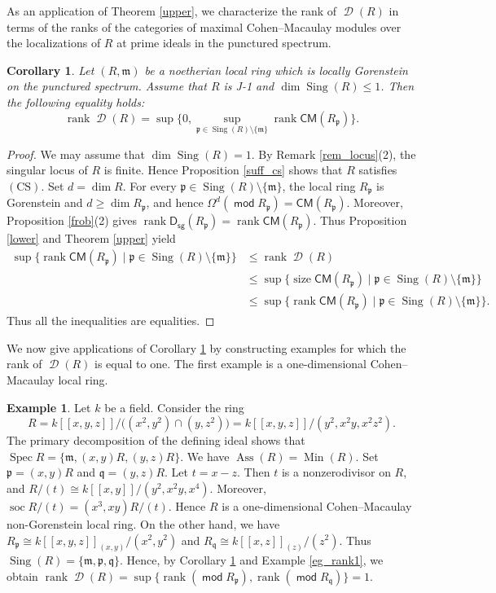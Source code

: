 \documentclass[10pt]{amsart}
\newtheorem{cor}[thm]{Corollary}
\theoremstyle{definition}
\newtheorem{ex}[thm]{Example}
\theoremstyle{remark}
\numberwithin{equation}{thm}
\def\Ass{\operatorname{Ass}}
\def\CM{\mathsf{CM}}
\def\d{\operatorname{\mathscr{D}}}
\def\dim{\operatorname{dim}}
\def\ds{\operatorname{\mathsf{D_{sg}}}}
\def\ge{\geqslant}
\def\le{\leqslant}
\def\m{\mathfrak{m}}
\def\Min{\operatorname{Min}}
\def\mod{\operatorname{\mathsf{mod}}}
\def\p{\mathfrak{p}}
\def\q{\mathfrak{q}}
\def\rank{\operatorname{rank}}
\def\Sing{\operatorname{Sing}}
\def\size{\operatorname{size}}
\def\soc{\operatorname{soc}}
\def\Spec{\operatorname{Spec}}
\def\sup{\operatorname{sup}}
\begin{document}
As an application of Theorem \ref{upper}, we characterize the rank of $\d(R)$ in terms of the ranks of the categories of maximal Cohen--Macaulay modules over the localizations of $R$ at prime ideals in the punctured spectrum.
\begin{cor}\label{equality}
Let $(R,\m)$ be a noetherian local ring which is locally Gorenstein on the punctured spectrum.
Assume that $R$ is J-1 and $\dim\Sing(R)\le1$.
Then the following equality holds:
\[
\rank\d(R)=\sup\{0,\sup_{\p\in\Sing(R)\setminus\{\m\}}\rank\CM(R_{\p})\}.
\]
\end{cor}
\begin{proof}
We may assume that $\dim\Sing(R)=1$.
By Remark \ref{rem_locus}(2), the singular locus of $R$ is finite. 
Hence Proposition \ref{suff_cs} shows that $R$ satisfies $(\mathrm{CS})$.
Set $d=\dim R$. 
For every $\p\in\Sing(R)\setminus\{\m\}$, the local ring $R_{\p}$ is Gorenstein and $d\ge\dim R_{\p}$, and hence $\Omega^{d}(\mod R_{\p})=\CM(R_{\p})$. 
Moreover, Proposition \ref{frob}(2) gives $\rank\ds(R_{\p})=\rank\CM(R_{\p})$.
Thus Proposition \ref{lower} and Theorem \ref{upper} yield
\begin{align*}
\sup\{\rank\CM(R_{\p})\mid\p\in\Sing(R)\setminus\{\m\}\}&\le\rank\d(R)\\
&\le\sup\{\size\CM(R_{\p})\mid\p\in\Sing(R)\setminus\{\m\}\}\\
&\le\sup\{\rank\CM(R_{\p})\mid\p\in\Sing(R)\setminus\{\m\}\}.
\end{align*}
Thus all the inequalities are equalities.
\end{proof}
We now give applications of Corollary \ref{equality} by constructing examples for which the rank of $\d(R)$ is equal to one.
The first example is a one-dimensional Cohen--Macaulay local ring.
\begin{ex}\label{eg_dim1}
Let $k$ be a field. 
Consider the ring
\[
R=k[\![x,y,z]\!]/\bigl((x^2,y^2)\cap(y,z^2)\bigr)
 =k[\![x,y,z]\!]/(y^2,x^{2}y,x^{2}z^{2}).
\]
The primary decomposition of the defining ideal shows that $\Spec R=\{\m,(x,y)R,(y,z)R\}$.
We have $\Ass(R)=\Min(R)$. 
Set $\p=(x,y)R$ and $\q=(y,z)R$.
Let $t=x-z$. 
Then $t$ is a nonzerodivisor on $R$, and $R/(t)\cong k[\![x,y]\!]/(y^2,x^{2}y,x^4)$.
Moreover, $\soc R/(t)=(x^3,xy)R/(t)$.
Hence $R$ is a one-dimensional Cohen--Macaulay non-Gorenstein local ring.
On the other hand, we have $R_{\p}\cong k[\![x,y,z]\!]_{(x,y)}/(x^2,y^2)$ and $R_{\q}\cong k[\![x,z]\!]_{(z)}/(z^2)$.
Thus $\Sing(R)=\{\m,\p,\q\}$.
Hence, by Corollary \ref{equality} and Example \ref{eg_rank1}, we obtain 
$\rank \d(R)=\sup\{\rank(\mod R_{\p}),\rank(\mod R_{\q})\}=1$.
\end{ex}
\end{document}
